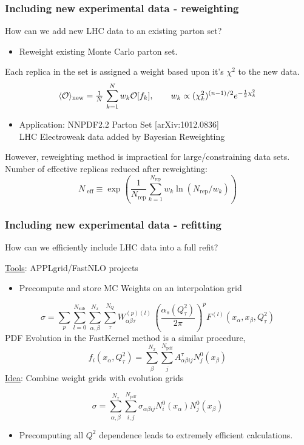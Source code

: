 \documentclass[10pt]{beamer}
\newcommand{\be}{\begin{equation*}}
\newcommand{\ee}{\end{equation*}}
\def\smallfrac#1#2{\hbox{${{#1}\over {#2}}$}}
\begin{document}
\begin{frame}
\frametitle{Including new experimental data - reweighting}
How can we add new LHC data to an existing parton set?

\begin{itemize}
		\item<1->Reweight existing Monte Carlo parton set.\\
\end{itemize}
Each replica in the set is assigned a weight based upon it's $\chi^2$ to the new data.
\be \langle\mathcal{O}\rangle_{\mathrm {new}}=\smallfrac{1}{N}\,\sum_{k=1}^{N}w_k\mathcal{O}[f_k], \quad\quad w_k \propto 
(\chi^{2}_k)^{(n-1)/2} 
e^{-\frac{1}{2}\chi^{2}_k}  \ee
\begin{itemize}
		\item<1-> Application: NNPDF2.2 Parton Set   \hfill {\color{blue} [arXiv:1012.0836]}\\
		LHC Electroweak data added by Bayesian Reweighting
\end{itemize}
\vskip10pt

However, reweighting method is impractical for large/constraining data sets.
 Number of effective replicas reduced after reweighting: \be N_{\textrm{ eff}} \equiv \exp \left(\frac{1}{N_{\mathrm{rep}}}\sum_{k=1}^{N_{\mathrm{rep}}}w_k\ln(N_{\mathrm{rep}}/w_k)\right)\ee

\end{frame}


\begin{frame}
\frametitle{Including new experimental data - refitting}
How can we efficiently include LHC data into a full refit?

\underline{Tools}: APPLgrid/FastNLO projects 

\begin{itemize}
\item<1-> Precompute and store MC Weights on an interpolation grid
\end{itemize}
\begin{equation}
\label{eq:applconv}
\sigma = \sum_p \sum_{l=0}^{N_{\mathrm{sub}}} \sum_{\alpha,\beta}^{N_x} \sum_{\tau}^{N_{Q}}
W_{\alpha\beta\tau}^{(p)(l)} \, \left( \frac{\alpha_s\left(Q^2_{\tau}\right)}{2\pi}\right)^{p}
F^{(l)}\left(x_{\alpha}, x_{\beta},  Q^2_{\tau}\right)
\end{equation}
PDF Evolution in the FastKernel method is a similar procedure,
\be f_i(x_{\alpha},Q^2_\tau) =  \sum_\beta^{N_{x}} \sum_{j}^{N_{\mathrm{pdf}}} A^{\tau}_{\alpha\beta ij}N^0_j(x_{\beta} )\ee 
\underline{Idea}: Combine weight grids with evolution grids 

  \be \sigma= \sum_{\alpha,\beta}^{N_x}\sum_{i,j}^{N_{\mathrm{pdf}}} \sigma_{\alpha\beta i j}N_i^0(x_\alpha)N_j^0(x_\beta)\ee
 \begin{itemize}
\item<1-> Precomputing all $Q^2$ dependence leads to extremely efficient calculations.
\end{itemize}\end{frame}
\end{document}
